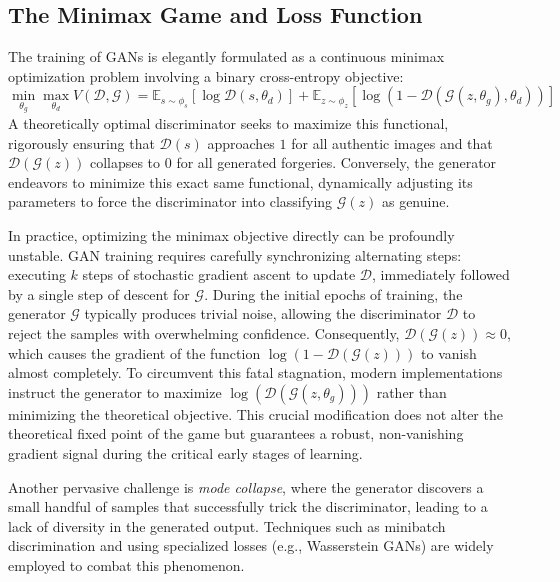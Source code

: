 \subsection{The Minimax Game and Loss Function}
The training of GANs is elegantly formulated as a continuous minimax optimization problem involving a binary cross-entropy objective:
\begin{equation}
\min_{\theta_g} \max_{\theta_d} V(\mathcal{D}, \mathcal{G}) = \mathbb{E}_{s \sim \phi_s}[\log \mathcal{D}(s, \theta_d)] + \mathbb{E}_{z \sim \phi_z}[\log(1 - \mathcal{D}(\mathcal{G}(z, \theta_g), \theta_d))]
\end{equation}
A theoretically optimal discriminator seeks to maximize this functional, rigorously ensuring that $\mathcal{D}(s)$ approaches $1$ for all authentic images and that $\mathcal{D}(\mathcal{G}(z))$ collapses to $0$ for all generated forgeries. Conversely, the generator endeavors to minimize this exact same functional, dynamically adjusting its parameters to force the discriminator into classifying $\mathcal{G}(z)$ as genuine. 

\begin{insightbox}
In practice, optimizing the minimax objective directly can be profoundly unstable. GAN training requires carefully synchronizing alternating steps: executing $k$ steps of stochastic gradient ascent to update $\mathcal{D}$, immediately followed by a single step of descent for $\mathcal{G}$.
During the initial epochs of training, the generator $\mathcal{G}$ typically produces trivial noise, allowing the discriminator $\mathcal{D}$ to reject the samples with overwhelming confidence. Consequently, $\mathcal{D}(\mathcal{G}(z)) \approx 0$, which causes the gradient of the function $\log(1 - \mathcal{D}(\mathcal{G}(z)))$ to vanish almost completely. To circumvent this fatal stagnation, modern implementations instruct the generator to maximize $\log(\mathcal{D}(\mathcal{G}(z, \theta_g)))$ rather than minimizing the theoretical objective. This crucial modification does not alter the theoretical fixed point of the game but guarantees a robust, non-vanishing gradient signal during the critical early stages of learning.

Another pervasive challenge is \textit{mode collapse}, where the generator discovers a small handful of samples that successfully trick the discriminator, leading to a lack of diversity in the generated output. Techniques such as minibatch discrimination and using specialized losses (e.g., Wasserstein GANs) are widely employed to combat this phenomenon.
\end{insightbox}


